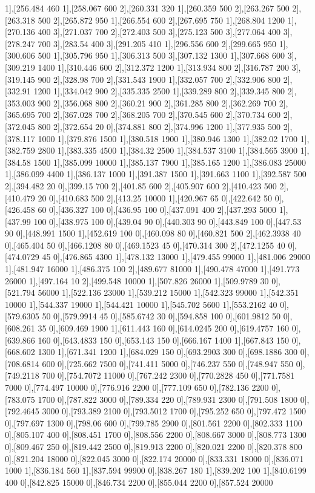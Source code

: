 {1],[256.484 460 1],[258.067 600 2],[260.331 320 1],[260.359 500 2],[263.267 500 2],[263.318 500 2],[265.872 950 1],[266.554 600 2],[267.695 750 1],[268.804 1200 1],[270.136 400 3],[271.037 700 2],[272.403 500 3],[275.123 500 3],[277.064 400 3],[278.247 700 3],[283.54 400 3],[291.205 410 1],[296.556 600 2],[299.665 950 1],[300.606 500 1],[305.796 950 1],[306.313 500 3],[307.132 1300 1],[307.668 600 3],[309.219 1400 1],[310.446 600 2],[312.372 1200 1],[313.934 800 2],[316.787 200 3],[319.145 900 2],[328.98 700 2],[331.543 1900 1],[332.057 700 2],[332.906 800 2],[332.91 1200 1],[334.042 900 2],[335.335 2500 1],[339.289 800 2],[339.345 800 2],[353.003 900 2],[356.068 800 2],[360.21 900 2],[361.285 800 2],[362.269 700 2],[365.695 700 2],[367.028 700 2],[368.205 700 2],[370.545 600 2],[370.734 600 2],[372.045 800 2],[372.654 20 0],[374.881 800 2],[374.996 1200 1],[377.935 500 2],[378.117 1000 1],[379.876 1500 1],[380.518 1900 1],[380.946 1300 1],[382.02 1700 1],[382.759 2800 1],[383.335 4500 1],[384.32 2500 1],[384.537 3100 1],[384.565 3900 1],[384.58 1500 1],[385.099 10000 1],[385.137 7900 1],[385.165 1200 1],[386.083 25000 1],[386.099 4400 1],[386.137 1000 1],[391.387 1500 1],[391.663 1100 1],[392.587 500 2],[394.482 20 0],[399.15 700 2],[401.85 600 2],[405.907 600 2],[410.423 500 2],[410.479 20 0],[410.683 500 2],[413.25 10000 1],[420.967 65 0],[422.642 50 0],[426.458 60 0],[436.327 100 0],[436.95 100 0],[437.091 400 2],[437.293 5000 1],[437.99 100 0],[438.975 100 0],[439.04 90 0],[440.303 90 0],[443.849 100 0],[447.53 90 0],[448.991 1500 1],[452.619 100 0],[460.098 80 0],[460.821 500 2],[462.3938 40 0],[465.404 50 0],[466.1208 80 0],[469.1523 45 0],[470.314 300 2],[472.1255 40 0],[474.0729 45 0],[476.865 4300 1],[478.132 13000 1],[479.455 99000 1],[481.006 29000 1],[481.947 16000 1],[486.375 100 2],[489.677 81000 1],[490.478 47000 1],[491.773 26000 1],[497.164 10 2],[499.548 10000 1],[507.826 26000 1],[509.9789 30 0],[521.794 56000 1],[522.136 23000 1],[539.212 15000 1],[542.323 99000 1],[542.351 10000 1],[544.337 19000 1],[544.421 10000 1],[545.702 5600 1],[553.2162 40 0],[579.6305 50 0],[579.9914 45 0],[585.6742 30 0],[594.858 100 0],[601.9812 50 0],[608.261 35 0],[609.469 1900 1],[611.443 160 0],[614.0245 200 0],[619.4757 160 0],[639.866 160 0],[643.4833 150 0],[653.143 150 0],[666.167 1400 1],[667.843 150 0],[668.602 1300 1],[671.341 1200 1],[684.029 150 0],[693.2903 300 0],[698.1886 300 0],[708.6814 600 0],[725.662 7500 0],[741.411 5000 0],[746.237 550 0],[748.947 550 0],[749.2118 700 0],[754.7072 11000 0],[767.242 2300 0],[770.2828 450 0],[771.7581 7000 0],[774.497 10000 0],[776.916 2200 0],[777.109 650 0],[782.136 2200 0],[783.075 1700 0],[787.822 3000 0],[789.334 220 0],[789.931 2300 0],[791.508 1800 0],[792.4645 3000 0],[793.389 2100 0],[793.5012 1700 0],[795.252 650 0],[797.472 1500 0],[797.697 1300 0],[798.06 600 0],[799.785 2900 0],[801.561 2200 0],[802.333 1100 0],[805.107 400 0],[808.451 1700 0],[808.556 2200 0],[808.667 3000 0],[808.773 1300 0],[809.467 250 0],[819.442 2500 0],[819.913 2200 0],[820.021 2200 0],[820.378 800 0],[821.204 18000 0],[822.045 3000 0],[822.174 20000 0],[833.331 18000 0],[836.071 1000 1],[836.184 560 1],[837.594 99900 0],[838.267 180 1],[839.202 100 1],[840.6199 400 0],[842.825 15000 0],[846.734 2200 0],[855.044 2200 0],[857.524 20000 }
